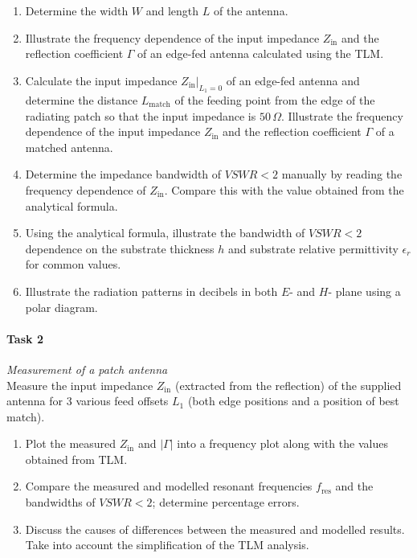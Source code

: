 \documentclass[11pt,a4paper]{article}
\begin{document}
    \begin{enumerate}[label=1.\arabic*]
        \item Determine the width $W$ and length $L$ of the antenna.
        \item Illustrate the frequency dependence of the input impedance $Z_{\mathrm{in}}$ and the reflection coefficient $\Gamma$ of an edge-fed antenna calculated using the TLM.
        \item Calculate the input impedance $Z_{\mathrm{in}}|_{L_1 = 0}$ of an edge-fed antenna and determine the distance $L_{\mathrm{match}}$ of the feeding point from the edge of the radiating patch so that the input impedance is $50\, \Omega$. Illustrate the frequency dependence of the input impedance $Z_{\mathrm{in}}$ and the reflection coefficient $\Gamma$ of a matched antenna.
        \item Determine the impedance bandwidth of $\mathit{VSWR} < 2$ manually by reading the frequency dependence of $Z_{\mathrm{in}}$. Compare this with the value obtained from the analytical formula.
        \item Using the analytical formula, illustrate the bandwidth of $\mathit{VSWR} < 2$ dependence on the substrate thickness $h$ and substrate relative permittivity $\epsilon_{r}$ for common values.
        \item Illustrate the radiation patterns in decibels in both $E$- and $H$- plane using a polar diagram.
    \end{enumerate}

    \paragraph{Task 2} \emph{Measurement of a patch antenna}\\
    Measure the input impedance $Z_{\mathrm{in}}$ (extracted from the reflection) of the supplied antenna for 3 various feed offsets $L_1$ (both edge positions and a position of best match).
    \begin{enumerate}[label=2.\arabic*]
        \item Plot the measured $Z_{\mathrm{in}}$ and $|\Gamma|$ into a frequency plot along with the values obtained from TLM.
        \item Compare the measured and modelled resonant frequencies $f_{\mathrm{res}}$ and the bandwidths of $\mathit{VSWR} < 2$; determine percentage errors.
        \item Discuss the causes of differences between the measured and modelled results. Take into account the simplification of the TLM analysis.
    \end{enumerate}
\end{document}
